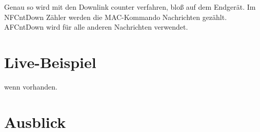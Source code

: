 \documentclass[a4paper,12pt]{article}
\begin{document}
            Genau so wird mit den Downlink counter verfahren, bloß auf dem Endgerät. Im NFCntDown Zähler werden die 
            MAC-Kommando Nachrichten gezählt. AFCntDown wird für alle anderen Nachrichten verwendet.\cite[S.22 ff]{LoRaSec}

    \section{Live-Beispiel}
        wenn vorhanden.

    \section{Ausblick}
        \newpage
    
    
\end{document}
